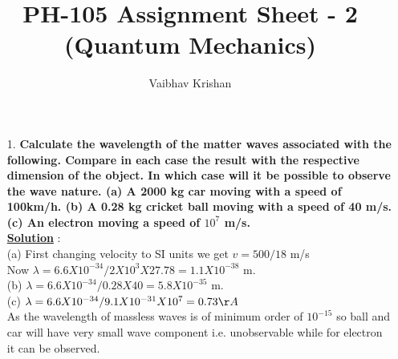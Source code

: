 \documentclass[10pt, a4paper]{article}
\begin{document}
	\title{PH-105 Assignment Sheet - 2 (Quantum Mechanics)}
	\date{}
	\author{Vaibhav Krishan}
	\maketitle
	\newcommand{\angstrom}{\mbox{\normalfont\AA}}
	\begin{enumerate}
		\item[1.] {\bf Calculate the wavelength of the matter waves associated with the following. Compare in each case the result with the respective dimension of the object. In which case will it be possible to observe the wave nature.
(a) A 2000 kg car moving with a speed of 100km/h.
(b) A 0.28 kg cricket ball moving with a speed of 40 m/s.
(c) An electron moving a speed of \begin{math} 10^7 \end{math} m/s.}\\
		{\underline {\bf Solution}} :\\
		(a) 
		First changing velocity to SI units we get
		\begin{math} v = 500/18\end{math} m/s\\
		Now
		\begin{math} \lambda = 6.6 X 10^{-34} / 2 X 10^3 X 27.78 = 1.1 X 10^{-38}\end{math} m.\\
		(b)
		\begin{math} \lambda = 6.6 X 10^{-34} / 0.28  X 40 = 5.8 X 10^{-35}\end{math} m.\\
		(c)
		\begin{math} \lambda = 6.6 X 10^{-34} / 9.1X10^{-31} X 10^7 = 0.73 \AA \end{math}\\
		As the wavelength of massless waves is of minimum order of \begin{math} 10^{-15} \end{math} so ball and car will have very small wave component i.e. unobservable while for electron it can be observed.\\
	\end{enumerate}
\end{document}
